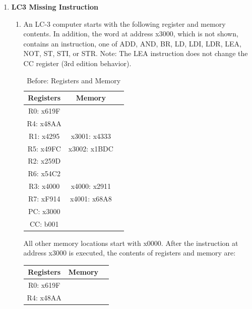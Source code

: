\documentclass{article}
\begin{document}
\begin{enumerate}[label=(\alph*)]
\begin{enumerate}[label=(\alph*)]
        \item \textbf{LC3 Missing Instruction}
        \begin{enumerate}[label=(\roman*)]
            \item An LC-3 computer starts with the following register and memory contents. In addition, the word at address x3000, which is not shown, contains an instruction, one of ADD, AND, BR, LD, LDI, LDR, LEA, NOT, ST, STI, or STR. Note: The LEA instruction does not change the CC register (3rd edition behavior).
            \begin{table}[h]
            \centering
            \begin{tabular}{|c|c|c|}
            \hline
            \textbf{Registers} & \textbf{Memory} & \\
            \hline
            R0: x619F & & \\
            \hline
            R4: x48AA & & \\
            \hline
            R1: x4295 & x3001: x4333 & \\
            \hline
            R5: x49FC & x3002: x1BDC & \\
            \hline
            R2: x259D & & \\
            \hline
            R6: x54C2 & & \\
            \hline
            R3: x4000 & x4000: x2911 & \\
            \hline
            R7: xF914 & x4001: x68A8 & \\
            \hline
            PC: x3000 & & \\
            \hline
            CC: b001 & & \\
            \hline
            \end{tabular}
            \caption{Before: Registers and Memory}
            \label{tab:before}
            \end{table}
            \newline
            All other memory locations start with x0000. After the instruction at address x3000 is executed, the contents of registers and memory are:
            \begin{table}[h]
            \centering
            \begin{tabular}{|c|c|c|}
            \hline
            \textbf{Registers} & \textbf{Memory} & \\
            \hline
            R0: x619F & & \\
            \hline
            R4: x48AA & & \\

\end{tabular}
\end{table}
\end{enumerate}
\end{enumerate}
\end{enumerate}
\end{document}

